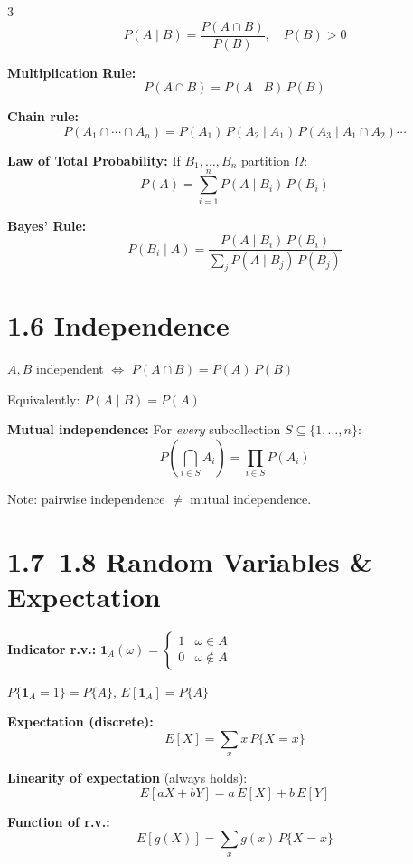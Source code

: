 \documentclass[10pt,landscape]{article}
\begin{document}
\begin{multicols}{3}
\[
  P(A \mid B) = \frac{P(A \cap B)}{P(B)}, \quad P(B) > 0
\]

\textbf{Multiplication Rule:}
\[
  P(A \cap B) = P(A \mid B)\,P(B)
\]

\textbf{Chain rule:}
\[
  P(A_1 \cap \cdots \cap A_n) = P(A_1)\,P(A_2 \mid A_1)\,P(A_3 \mid A_1 \cap A_2) \cdots
\]

\textbf{Law of Total Probability:}
If $B_1, \ldots, B_n$ partition $\Omega$:
\[
  P(A) = \sum_{i=1}^{n} P(A \mid B_i)\,P(B_i)
\]

\textbf{Bayes' Rule:}
\[
  P(B_i \mid A) = \frac{P(A \mid B_i)\,P(B_i)}{\displaystyle\sum_{j} P(A \mid B_j)\,P(B_j)}
\]

\section*{1.6 Independence}

$A, B$ independent $\iff$ $P(A \cap B) = P(A)\,P(B)$

Equivalently: $P(A \mid B) = P(A)$

\textbf{Mutual independence:} For \emph{every} subcollection $S \subseteq \{1,\ldots,n\}$:
\[
  P\!\left(\bigcap_{i \in S} A_i\right) = \prod_{i \in S} P(A_i)
\]

Note: pairwise independence $\neq$ mutual independence.

\section*{1.7--1.8 Random Variables \& Expectation}

\textbf{Indicator r.v.:} $\mathbf{1}_A(\omega) = \begin{cases} 1 & \omega \in A \\ 0 & \omega \notin A \end{cases}$

$P\{\mathbf{1}_A = 1\} = P\{A\}$, \quad $E[\mathbf{1}_A] = P\{A\}$

\textbf{Expectation (discrete):}
\[
  E[X] = \sum_{x} x\,P\{X = x\}
\]

\textbf{Linearity of expectation} (always holds):
\[
  E[aX + bY] = a\,E[X] + b\,E[Y]
\]

\textbf{Function of r.v.:}
\[
  E[g(X)] = \sum_{x} g(x)\,P\{X = x\}
\]


\end{multicols}
\end{document}
